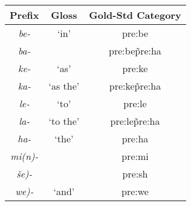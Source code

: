 \begin{table}[t]
\begin{tabular}{ccc}
\toprule
Prefix & Gloss & Gold-Std Category \\
\midrule
\textit{be-} & `in'	& pre:be   \\                    
\textit{ba-}	& & pre:be\~pre:ha    \\                              
\textit{ke-}	&`as'  & pre:ke \\                
\textit{ka-}	& `as the'& pre:ke\~pre:ha \\          
\textit{le-}	& `to' & pre:le  \\               
\textit{la-}	& `to the' & pre:le\~pre:ha \\
\textit{ha-}	& `the' & pre:ha  \\      
\textit{mi(n)-} & & pre:mi  \\               
\textit{\v{s}e)-}	& & pre:sh \\
\textit{we)-} & `and' & pre:we \\
\bottomrule
\end{tabular}
\end{table}
%			
%		
%		
%
%		
